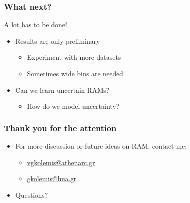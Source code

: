 \documentclass{beamer}
\begin{document}
\begin{frame}
  \frametitle{What next?}
  A lot has to be done!
  \begin{itemize}
  \item Results are only preliminary
    \begin{itemize}
      \item Experiment with more datasets
      \item Sometimes wide bins are needed
      \end{itemize}
    \item Can we learn uncertain RAMs?
      \begin{itemize}
      \item How do we model uncertainty?
      \end{itemize}
  \end{itemize}

  \noindent\makebox[\linewidth]{\rule{\paperwidth}{0.4pt}}

\end{frame}


\begin{frame}
  \frametitle{Thank you for the attention}
  \begin{itemize}
  \item For more discussion or future ideas on RAM, contact me:
    \begin{itemize}
    \item \href{vgkolemis@athenarc.gr}{vgkolemis@athenarc.gr}
      \item \href{gkolemis@hua.gr}{gkolemis@hua.gr}
    \end{itemize}
  \item Questions?
  \end{itemize}
\end{frame}



\end{document}
